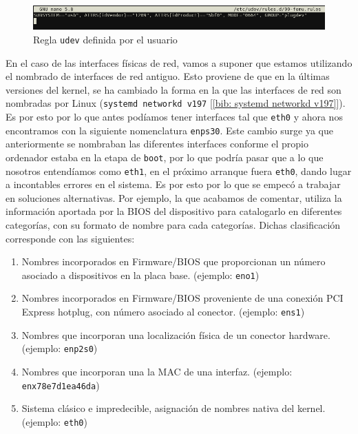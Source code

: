 \documentclass[12pt]{article}
\begin{document}
	\begin{figure}[h!]
		\begin{center}
			\includegraphics[width=1\textwidth]{img/udev_rule.png}
			\caption{Regla \texttt{udev} definida por el usuario} 
			\label{img: udev rule}
		\end{center}
	\end{figure}
	
	\noindent En el caso de las interfaces físicas de red, vamos a suponer que estamos utilizando el nombrado de interfaces de red antiguo. Esto proviene de que en la últimas versiones del kernel, se ha cambiado la forma en la que las interfaces de red son nombradas por Linux (\texttt{systemd networkd v197} [\ref{bib: systemd networkd v197}]). Es por esto por lo que antes podíamos tener interfaces tal que \texttt{eth0} y ahora nos encontramos con la siguiente nomenclatura \texttt{enps30}. Este cambio surge ya que anteriormente se nombraban las diferentes interfaces conforme el propio ordenador estaba en la etapa de \texttt{boot}, por lo que podría pasar que a lo que nosotros entendíamos como \texttt{eth1}, en el próximo arranque fuera \texttt{eth0}, dando lugar a incontables errores en el sistema. Es por esto por lo que se empecó a trabajar en soluciones alternativas. Por ejemplo, la que acabamos de comentar, utiliza la información aportada por la BIOS del dispositivo para catalogarlo en diferentes categorías, con su formato de nombre para cada categorías. Dichas clasificación corresponde con las siguientes:
	\begin{enumerate}
		\item Nombres incorporados en Firmware/BIOS que proporcionan un número asociado a dispositivos en la placa base. (ejemplo: \texttt{eno1})
		\item Nombres incorporados en Firmware/BIOS proveniente de una conexión PCI Express hotplug, con número asociado al conector. (ejemplo: \texttt{ens1})
		\item Nombres que incorporan una localización física de un conector hardware. (ejemplo: \texttt{enp2s0})
		\item Nombres que incorporan una la MAC de una interfaz. (ejemplo: \texttt{enx78e7d1ea46da})
		\item Sistema clásico e impredecible, asignación de nombres nativa del kernel. (ejemplo: \texttt{eth0})
	\end{enumerate}
	
\end{document}
